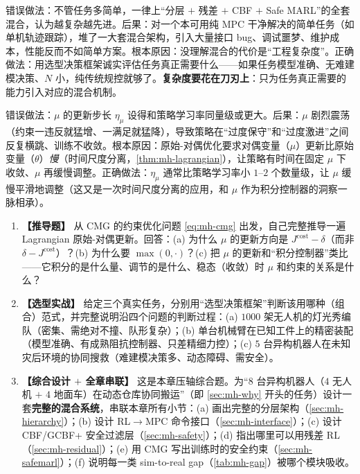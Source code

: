 \begin{pitfall}
错误做法：不管任务多简单，一律上“分层 $+$ 残差 $+$ CBF $+$ Safe MARL”的全套混合，认为越复杂越先进。后果：对一个本可用纯 MPC 干净解决的简单任务（如单机轨迹跟踪），堆了一大套混合架构，引入大量接口 bug、调试噩梦、维护成本，性能反而不如简单方案。根本原因：没理解混合的代价是“工程复杂度”。正确做法：用选型决策框架诚实评估任务真正需要什么——如果任务模型准确、无难建模决策、$N$ 小，纯传统规控就够了。\textbf{复杂度要花在刀刃上}：只为任务真正需要的能力引入对应的混合机制。
\end{pitfall}

\begin{pitfall}
错误做法：$\mu$ 的更新步长 $\eta_\mu$ 设得和策略学习率同量级或更大。后果：$\mu$ 剧烈震荡（约束一违反就猛增、一满足就猛降），导致策略在“过度保守”和“过度激进”之间反复横跳、训练不收敛。根本原因：原始-对偶优化要求对偶变量（$\mu$）更新比原始变量（$\theta$）\emph{慢}（时间尺度分离，\cref{thm:mh-lagrangian}），让策略有时间在固定 $\mu$ 下收敛、$\mu$ 再缓慢调整。正确做法：$\eta_\mu$ 通常比策略学习率小 $1$--$2$ 个数量级，让 $\mu$ 缓慢平滑地调整（这又是一次时间尺度分离的应用，和 $\mu$ 作为积分控制器的洞察一脉相承）。
\end{pitfall}

\begin{practice}
\begin{enumerate}
  \item \textbf{【推导题】} 从 CMG 的约束优化问题 \cref{eq:mh-cmg} 出发，自己完整推导一遍 Lagrangian 原始-对偶更新。回答：(a) 为什么 $\mu$ 的更新方向是 $J^{\text{cost}}-\delta$（而非 $\delta-J^{\text{cost}}$）？(b) 为什么要 $\max(0,\cdot)$？(c) 把 $\mu$ 的更新和“积分控制器”类比——它积分的是什么量、调节的是什么、稳态（收敛）时 $\mu$ 和约束的关系是什么？
  \item \textbf{【选型实战】} 给定三个真实任务，分别用“选型决策框架”判断该用哪种（组合）范式，并完整说明沿四个问题的判断过程：(a) $1000$ 架无人机的灯光秀编队（密集、需绝对不撞、队形复杂）；(b) 单台机械臂在已知工件上的精密装配（模型准确、有成熟阻抗控制器、只差精细力控）；(c) $5$ 台异构机器人在未知灾后环境的协同搜救（难建模决策多、动态障碍、需安全）。
  \item \textbf{【综合设计 $+$ 全章串联】} 这是本章压轴综合题。为“$8$ 台异构机器人（$4$ 无人机 $+$ $4$ 地面车）在动态仓库协同搬运”（即 \cref{sec:mh-why} 开头的任务）设计一套\textbf{完整的混合系统}，串联本章所有小节：(a) 画出完整的分层架构（\cref{sec:mh-hierarchy}）；(b) 设计 RL$\to$MPC 命令接口（\cref{sec:mh-interface}）；(c) 设计 CBF/GCBF+ 安全过滤层（\cref{sec:mh-safety}）；(d) 指出哪里可以用残差 RL（\cref{sec:mh-residual}）；(e) 用 CMG 写出训练时的安全约束（\cref{sec:mh-safemarl}）；(f) 说明每一类 sim-to-real gap（\cref{tab:mh-gap}）被哪个模块吸收。
\end{enumerate}
\end{practice}

